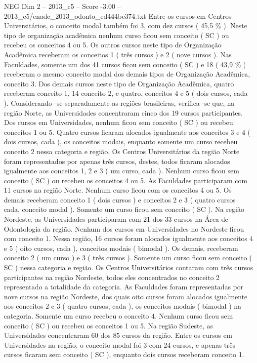 \begin{textsample}{NEG Dim 2 – 2013\_c5 – Score -3.00 – 2013\_c5/enade\_2013\_odonto\_ed444be374.txt}
Entre os cursos em Centros Universitários, o conceito modal também foi 3, com dez cursos ( 45,5 \% ).
Neste tipo de organização acadêmica nenhum curso ficou sem conceito ( SC ) ou recebeu os conceitos 4 ou 5.
Os outros cursos neste tipo de Organização Acadêmica receberam os conceitos 1 ( três cursos ) e 2 ( nove cursos ).
Nas Faculdades, somente um dos 41 cursos ficou sem conceito ( SC ) e 18 ( 43,9 \% ) receberam o mesmo conceito modal dos demais tipos de Organização Acadêmica, conceito 3.
Dos demais cursos neste tipo de Organização Acadêmica, quatro receberam conceito 1, 14 conceito 2, e quatro, conceitos 4 e 5 ( dois cursos, cada ).
Considerando -se separadamente as regiões brasileiras, verifica -se que, na região Norte, as Universidades concentraram cinco dos 19 cursos participantes.
Dos cursos em Universidades, nenhum ficou sem conceito ( SC ) ou recebeu conceitos 1 ou 5.
Quatro cursos ficaram alocados igualmente aos conceitos 3 e 4 ( dois cursos, cada ), os conceitos modais, enquanto somente um curso recebeu conceito 2 nessa categoria e região.
Os Centros Universitários da região Norte foram representados por apenas três cursos, destes, todos ficaram alocados igualmente aos conceitos 1, 2 e 3 ( um curso, cada ).
Nenhum curso ficou sem conceito ( SC ) ou recebeu os conceitos 4 ou 5.
As Faculdades participaram com 11 cursos na região Norte.
Nenhum curso ficou com os conceitos 4 ou 5.
Os demais receberam conceito 1 ( dois cursos ) e conceitos 2 e 3 ( quatro cursos cada, conceito modal ).
Somente um curso ficou sem conceito ( SC ).
Na região Nordeste, as Universidades participaram com 21 dos 33 cursos na Área de Odontologia da região.
Nenhum dos cursos em Universidades no Nordeste ficou com conceito 1.
Nessa região, 16 cursos foram alocados igualmente aos conceitos 4 e 5 ( oito cursos, cada ), conceitos modais ( bimodal ).
Os demais, receberam conceito 2 ( um curso ) e 3 ( três cursos ).
Somente um curso ficou sem conceito ( SC ) nessa categoria e região.
Os Centros Universitários contaram com três cursos participantes na região Nordeste, todos eles concentrados no conceito 2 representado a totalidade da categoria.
As Faculdades foram representadas por nove cursos na região Nordeste, dos quais oito cursos foram alocados igualmente aos conceitos 2 e 3 ( quatro cursos, cada ), os conceitos modais ( bimodal ) na categoria.
Somente um curso recebeu o conceito 4.
Nenhum curso ficou sem conceito ( SC ) ou recebeu os conceitos 1 ou 5.
Na região Sudeste, as Universidades concentraram 60 dos 85 cursos da região.
Entre os cursos em Universidades na região, o conceito modal foi 3 com 24 cursos, e apenas três cursos ficaram sem conceito ( SC ), enquanto dois cursos receberam conceito 1.

\end{textsample}
